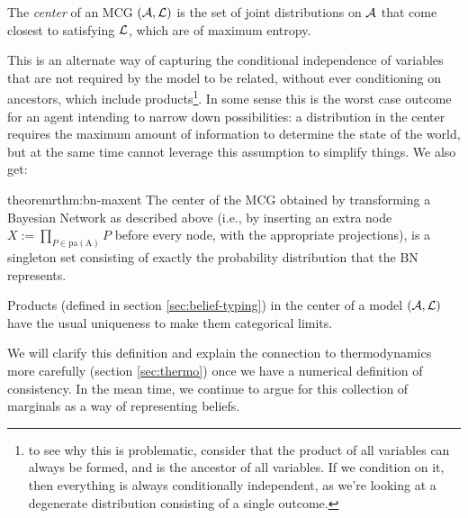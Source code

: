 \documentclass{article}
\begin{document}
	\begin{defn*}
		The \emph{center} of an MCG $(\cal A, L)$ is the set of joint distributions on $\cal A$ that come closest to satisfying $\cal L$, which are of maximum entropy.
	\end{defn*}
	
	This is an alternate way of capturing the conditional independence of variables that are not required by the model to be related, without ever conditioning on ancestors, which include products\footnote{to see why this is problematic, consider that the product of all variables can always be formed, and is the ancestor of all variables. If we condition on it, then everything is always conditionally independent, as we're looking at a degenerate distribution consisting of a single outcome.}.  In some sense this is the worst case outcome for an agent intending to narrow down possibilities: a distribution in the center requires the maximum amount of information to determine the state of the world, but at the same time cannot leverage this assumption to simplify things. %
	We also get:
	
	
	\begin{restatable}{theorem}{rthm:bn-maxent} \label{rthm:bn-maxent}
		The center of the MCG obtained by transforming a Bayesian Network as described above (i.e., by inserting an extra node $X := \prod_{P \in \mathrm{pa(A)}} P$ before every node, with the appropriate projections), is a singleton set consisting of exactly the probability distribution that the BN represents.
	\end{restatable}
	
	\begin{coro}
		Products (defined in section \ref{sec:belief-typing}) in the center of a model $(\cal A, L)$ have the usual uniqueness to make them categorical limits.
	\end{coro}
	
	We will clarify this definition and explain the connection to thermodynamics more carefully (section \ref{sec:thermo}) once we have a numerical definition of consistency. In the mean time, we continue to argue for this collection of marginals as a way of representing beliefs.
	
\end{document}
